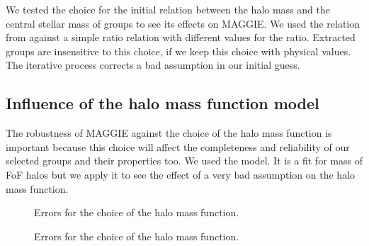We tested the choice for the initial relation between the halo mass and the
central stellar mass of groups to see its effects on MAGGIE\@. We used the
relation from \citet{BCW+10} against a simple ratio relation with different
values for the ratio. Extracted groups are insensitive to this choice, if we
keep this choice with physical values. The iterative process corrects a bad
assumption in our initial guess.

\subsection{Influence of the halo mass function model}

The robustness of MAGGIE against the choice of the halo mass function is
important because this choice will affect the completeness and reliability
of our selected groups and their properties too. We used the
\citet{Warren+06} model. It is a fit for mass of FoF halos but we apply it
to see the effect of a very bad assumption on the halo mass function.
%
\begin{figure}[ht]
    \centering
    \begin{minipage}{0.49\linewidth}
    \end{minipage}
    \begin{minipage}{0.49\linewidth}
    \end{minipage}
    \caption{Errors for the choice of the halo mass function.\label{fig:cdf_hmf}}
\end{figure}
%
\begin{figure}[htb]
    \centering
    \begin{minipage}{0.49\linewidth}
    \end{minipage}
    \begin{minipage}{0.49\linewidth}
    \end{minipage}
    \begin{minipage}{0.49\linewidth}
    \end{minipage}
    \caption{Errors for the choice of the halo mass function.\label{fig:bias_disp_hmf}}
\end{figure}

